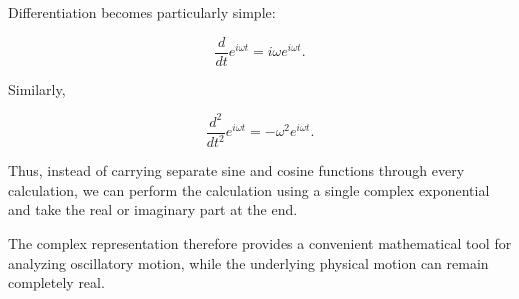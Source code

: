 \documentclass[../main.tex]{subfiles}
\theoremstyle{remark}
\begin{document}
Differentiation becomes particularly simple:

\[
\frac{d}{dt}e^{i\omega t}
=
i\omega e^{i\omega t}.
\]

Similarly,

\[
\frac{d^2}{dt^2}e^{i\omega t}
=
-\omega^2e^{i\omega t}.
\]

Thus, instead of carrying separate sine and cosine functions through every calculation, we can perform the calculation using a single complex exponential and take the real or imaginary part at the end.

The complex representation therefore provides a convenient mathematical tool for analyzing oscillatory motion, while the underlying physical motion can remain completely real.
\end{document}
